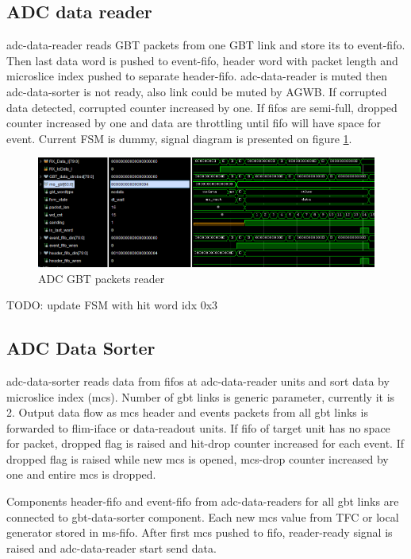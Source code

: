 \documentclass{article}
\begin{document}
\subsection{ADC data reader}\label{sec:data-reader}
adc-data-reader reads GBT packets from one GBT link and store its to event-fifo. Then last data word is pushed to event-fifo, header word with packet length and microslice index pushed to separate header-fifo. adc-data-reader is muted then adc-data-sorter is not ready, also link could be muted by AGWB.
If corrupted data detected, corrupted counter increased by one. If fifos are semi-full, dropped counter increased by one and data are throttling until fifo will have space for event. Current FSM is dummy, signal diagram is presented on figure \ref{fig:11}. 
 
\begin{figure}[H]
	\centering 
	\includegraphics[width=1.0\textwidth]{ADC_GBT_reader_wave.png}
	\caption{\label{fig:11} ADC GBT packets reader}
\end{figure}

TODO: update FSM with hit word idx 0x3



\subsection{ADC Data Sorter}\label{sec:data-sorter}
adc-data-sorter reads data from fifos at adc-data-reader units and sort data by microslice index (mcs). Number of gbt links is generic parameter, currently it is 2. Output data flow as mcs header and events packets from all gbt links is forwarded to flim-iface or data-readout units. If fifo of target unit has no space for packet, dropped flag is raised and hit-drop counter increased for each event. If dropped flag is raised while new mcs is opened, mcs-drop counter increased by one and entire mcs is dropped.

Components header-fifo and event-fifo from adc-data-readers for all gbt links are connected to gbt-data-sorter component. Each new mcs value from TFC or local generator stored in ms-fifo. After first mcs pushed to fifo, reader-ready signal is raised and adc-data-reader start send data.
\end{document}
